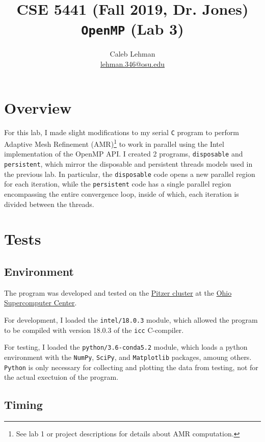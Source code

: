 \documentclass{article}
\title{\vspace{-2em}
CSE 5441 (Fall 2019, Dr. Jones)\\
\large \texttt{OpenMP} (Lab 3)
}
\author{
Caleb Lehman \\
\href{mailto:lehman.346@osu.edu}{lehman.346@osu.edu}
}
\begin{document}
\maketitle

\section*{Overview}
\label{sec:overview}

For this lab, I made slight modifications to my serial \texttt{C} program to
perform Adaptive Mesh Refinement (AMR)\footnote{See lab 1 or project
descriptions for details about AMR computation.} to work in parallel using the
Intel implementation of the OpenMP API.  I created 2 programs,
\texttt{disposable} and \texttt{persistent}, which mirror the disposable and
persistent threads models used in the previous lab. In particular, the
\texttt{disposable} code opens a new parallel region for each iteration, while
the \texttt{persistent} code has a single parallel region encompassing the
entire convergence loop, inside of which, each iteration is divided between the
threads.

\section*{Tests}
\label{sec:tests}

\subsection*{Environment}
\label{subsec:environment}

The program was developed and tested on the
\href{https://www.osc.edu/resources/technical_support/supercomputers/pitzer}{Pitzer
cluster} at the \href{https://www.osc.edu/}{Ohio Supercomputer Center}.

For development, I loaded the \texttt{intel/18.0.3} module, which allowed the
program to be compiled with version 18.0.3 of the \texttt{icc} C-compiler.

For testing, I loaded the \texttt{python/3.6-conda5.2} module, which loads a
python environment with the \texttt{NumPy}, \texttt{SciPy}, and
\texttt{Matplotlib} packages, amoung others. \texttt{Python} is only necessary
for collecting and plotting the data from testing, not for the actual exectuion
of the program.

\subsection*{Timing}
\label{subsec:timing}
\end{document}
